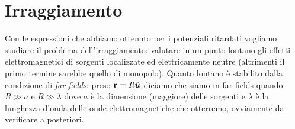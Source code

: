 \section{Irraggiamento}

Con le espressioni che abbiamo ottenuto per i potenziali ritardati vogliamo studiare il problema dell'irraggiamento: valutare in un punto lontano gli 
effetti elettromagnetici di sorgenti localizzate ed elettricamente neutre (altrimenti il primo termine sarebbe quello di monopolo). Quanto lontano è 
stabilito dalla condizione di \textit{far fields}: preso $ \mathbf{ r } = R \hat{\boldsymbol{u}} $ diciamo che siamo in far fields quando $ R \gg a $ e 
$ R \gg \lambda $ dove $ a $ è la dimensione (maggiore) delle sorgenti e $ \lambda $ è la lunghezza d'onda delle onde elettromagnetiche che otterremo, 
ovviamente da verificare a posteriori.

